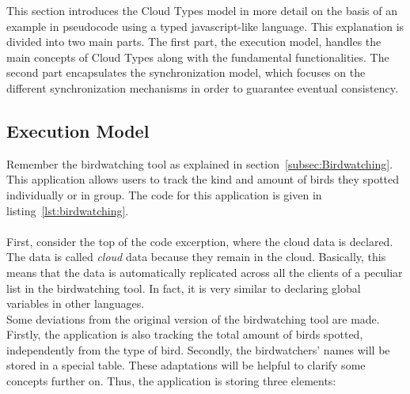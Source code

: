 \documentclass[a4paper,12pt]{report}
\begin{document}
This section introduces the Cloud Types model in more detail on the basis of an example in pseudocode using a typed javascript-like language. This explanation is divided into two main parts. The first part, the execution model, handles the main concepts of Cloud Types along with the fundamental functionalities. The second part encapsulates the synchronization model, which focuses on the different synchronization mechanisms in order to guarantee eventual consistency.

\begin{figure}
\begin{minipage}[t]{\textwidth}
\vspace{-3cm}

\end{minipage}
\end{figure}

\subsection{Execution Model}\label{subsec:ExecutionModel}

Remember the birdwatching tool as explained in section~\ref{subsec:Birdwatching}. This application allows users to track the kind and amount of birds they spotted individually or in group. The code for this application is given in listing~\ref{lst:birdwatching}. \\
\\
First, consider the top of the code excerption, where the cloud data is declared. The data is called \textit{cloud} data because they remain in the cloud. Basically, this means that the data is automatically replicated across all the clients of a peculiar list in the birdwatching tool. In fact, it is very similar to declaring global variables in other languages.\\ 
Some deviations from the original version of the birdwatching tool are made. Firstly, the application is also tracking the total amount of birds spotted, independently from the type of bird. Secondly, the birdwatchers' names will be stored in a special table. These adaptations will be helpful to clarify some concepts further on. Thus, the application is storing three elements:
\end{document}
